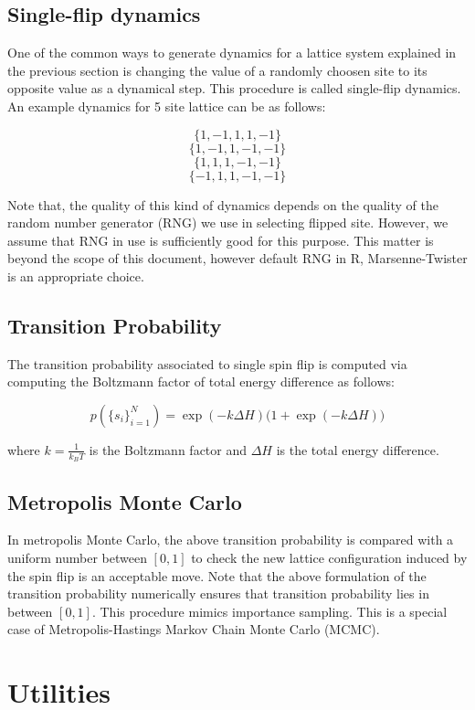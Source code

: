\documentclass[a4paper]{article}
\begin{document}
\subsection{Single-flip dynamics}
One of the common ways to generate dynamics for a lattice system explained in the previous section is changing
the value of a randomly choosen site to its opposite value as a dynamical step. This procedure is called single-flip
dynamics. An example dynamics for 5 site lattice can be as follows:

$$\{1, -1, 1, 1, -1\}$$
$$\{1, -1, 1, -1, -1\}$$
$$\{1, 1, 1, -1, -1\}$$
$$\{-1, 1, 1, -1, -1\}$$

Note that, the quality of this kind of dynamics depends on the quality of the random number generator (RNG) we use in selecting
flipped site. However, we assume that RNG in use is sufficiently good for this purpose. This matter is beyond the scope of 
this document, however default RNG in R, Marsenne-Twister is an appropriate choice.

\subsection{Transition Probability}

The transition probability associated to single spin flip is computed via computing the Boltzmann factor of total energy difference
as follows:

$$p(\{s_{i}\}_{i=1}^{N}) = \exp(-k  \Delta H) \big( 1 + \exp(-k  \Delta H) \big)$$

where $k = \frac{1}{k_{B}T}$ is the Boltzmann factor and $\Delta H$ is the total energy difference.

\subsection{Metropolis Monte Carlo}

In metropolis Monte Carlo, the above transition probability is compared with a uniform number between $[0, 1]$
to check the new lattice configuration induced by the spin flip is an acceptable move. Note that the above formulation
of the transition probability numerically ensures that transition probability lies in between $[0,1]$. This procedure
mimics importance sampling. This is a special case of Metropolis-Hastings Markov Chain Monte Carlo (MCMC).

\section{Utilities}
\end{document}
